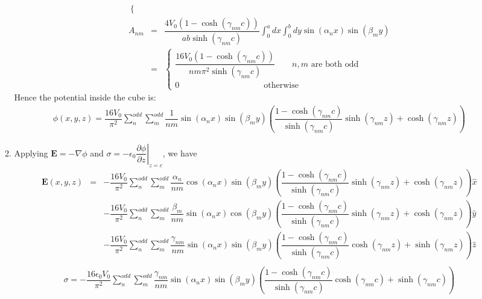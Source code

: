 \documentclass[a4paper,11pt]{article}
\begin{document}
\begin{enumerate}
\begin{enumerate}
\begin{eqnarray}
\begin{cases}
            \end{cases} \\
            A_{nm}&=&\dfrac{4V_0(1-\cosh(\gamma_{nm}c))}{ab\sinh(\gamma_{nm}c)}\int_{0}^{a}dx\int_{0}^{b}dy\sin(\alpha_n x)\sin(\beta_m y)\nonumber\\
            &=&\begin{cases}
                \dfrac{16V_0(1-\cosh(\gamma_{nm}c))}{nm\pi^2\sinh(\gamma_{nm}c)}\quad\quad \textrm{$n,m$ are both odd}\\
                0\quad\quad\quad\quad\quad\quad\quad\quad\quad\quad \textrm{otherwise}
            \end{cases} 
        \end{eqnarray}
        Hence the potential inside the cube is:
        \begin{eqnarray}
            \phi(x,y,z)=\dfrac{16V_0}{\pi^2}\sum\limits_{n}^{odd}\sum\limits_{m}^{odd}\dfrac{1}{nm}\sin(\alpha_n x)\sin(\beta_m y)\left(\dfrac{1-\cosh(\gamma_{nm}c)}{\sinh(\gamma_{nm}c)}\sinh(\gamma_{nm}z)+\cosh(\gamma_{nm}z)\right)
        \end{eqnarray}
        \item Applying $\boldsymbol{E}=-\nabla\phi$ and $\sigma=-\epsilon_0\left.\dfrac{\partial\phi}{\partial z}\right|_{z=c}$, we have
        \begin{eqnarray}
            \boldsymbol{E}(x,y,z)
            &=&-\dfrac{16V_0}{\pi^2}\sum\limits_{n}^{odd}\sum\limits_{m}^{odd}\dfrac{\alpha_n}{nm}\cos(\alpha_n x)\sin(\beta_m y)\left(\dfrac{1-\cosh(\gamma_{nm}c)}{\sinh(\gamma_{nm}c)}\sinh(\gamma_{nm}z)+\cosh(\gamma_{nm}z)\right)\hat{x} \nonumber \\
            &&-\dfrac{16V_0}{\pi^2}\sum\limits_{n}^{odd}\sum\limits_{m}^{odd}\dfrac{\beta_m}{nm}\sin(\alpha_n x)\cos(\beta_m y)\left(\dfrac{1-\cosh(\gamma_{nm}c)}{\sinh(\gamma_{nm}c)}\sinh(\gamma_{nm}z)+\cosh(\gamma_{nm}z)\right)\hat{y} \nonumber \\
            &&-\dfrac{16V_0}{\pi^2}\sum\limits_{n}^{odd}\sum\limits_{m}^{odd}\dfrac{\gamma_{nm}}{nm}\sin(\alpha_n x)\sin(\beta_m y)\left(\dfrac{1-\cosh(\gamma_{nm}c)}{\sinh(\gamma_{nm}c)}\cosh(\gamma_{nm}z)+\sinh(\gamma_{nm}z)\right)\hat{z} \nonumber \\
        \end{eqnarray}
        \begin{eqnarray}
            \sigma=-\dfrac{16\epsilon_0V_0}{\pi^2}\sum\limits_{n}^{odd}\sum\limits_{m}^{odd}\dfrac{\gamma_{nm}}{nm}\sin(\alpha_n x)\sin(\beta_m y)\left(\dfrac{1-\cosh(\gamma_{nm}c)}{\sinh(\gamma_{nm}c)}\cosh(\gamma_{nm}c)+\sinh(\gamma_{nm}c)\right) 

\end{eqnarray}
\end{enumerate}
\end{enumerate}
\end{document}
